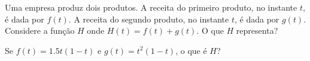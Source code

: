 Uma empresa produz dois produtos.
A receita do primeiro produto, no instante $t$, é dada por $f(t)$.
A receita do segundo produto, no instante $t$, é dada por $g(t)$.
Considere a função $H$ onde $H(t)=f(t)+g(t)$.
O que $H$ representa?

Se $f(t)=1.5t(1-t)$ e $g(t)=t^2(1-t)$, o que é $H$?
